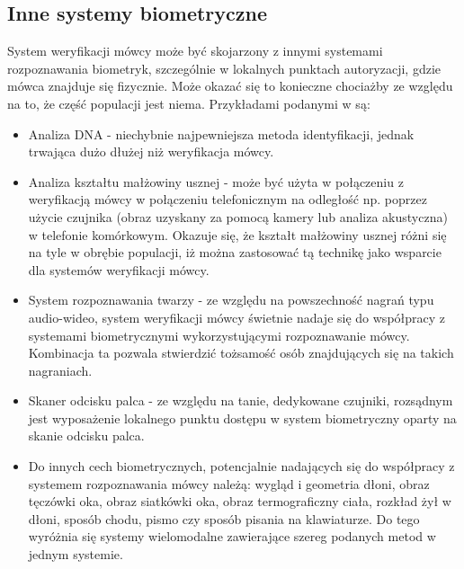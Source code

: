 \subsection{Inne systemy biometryczne}
System weryfikacji mówcy może być skojarzony z innymi systemami rozpoznawania biometryk, szczególnie w lokalnych punktach autoryzacji, gdzie mówca znajduje się fizycznie. Może okazać się to konieczne chociażby ze względu na to, że część populacji jest niema. Przykładami podanymi w \cite{fosr} są:
\begin{itemize}
  \item Analiza DNA - niechybnie najpewniejsza metoda identyfikacji, jednak trwająca dużo dłużej niż weryfikacja mówcy. 
  \item Analiza kształtu małżowiny usznej - może być użyta w połączeniu z weryfikacją mówcy w połączeniu telefonicznym na odległość np. poprzez użycie czujnika (obraz uzyskany za pomocą kamery lub analiza akustyczna) w telefonie komórkowym. Okazuje się, że kształt małżowiny usznej różni się na tyle w obrębie populacji, iż można zastosować tą technikę jako wsparcie dla systemów weryfikacji mówcy. 
  \item System rozpoznawania twarzy - ze względu na powszechność nagrań typu audio-wideo, system weryfikacji mówcy świetnie nadaje się do współpracy z systemami biometrycznymi wykorzystującymi rozpoznawanie mówcy. Kombinacja ta pozwala stwierdzić tożsamość osób znajdujących się na takich nagraniach. 
  \item Skaner odcisku palca - ze względu na tanie, dedykowane czujniki, rozsądnym jest wyposażenie lokalnego punktu dostępu w system biometryczny oparty na skanie odcisku palca.
  \item Do innych cech biometrycznych, potencjalnie nadających się do współpracy z systemem rozpoznawania mówcy należą: wygląd i geometria dłoni, obraz tęczówki oka, obraz siatkówki oka, obraz termograficzny ciała, rozkład żył w dłoni, sposób chodu, pismo czy sposób pisania na klawiaturze. Do tego wyróżnia się systemy wielomodalne zawierające szereg podanych metod w jednym systemie.
  
\end{itemize}

